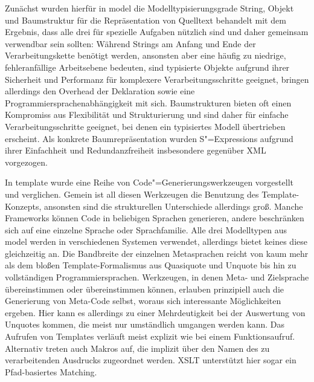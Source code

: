 \documentclass[12pt, a4paper, bibgerm]{scrbook}
\newcommand\cref{}
\newcommand{\sexps}{S"=Expressions}
\newcommand{\cgen}{Code"=Generierung}
\begin{document}
Zunächst wurden hierfür in \cref{model} die Modelltypisierungsgrade
String, Objekt und Baumstruktur für die Repräsentation von Quelltext
behandelt mit dem Ergebnis, dass alle drei für spezielle Aufgaben
nützlich sind und daher gemeinsam verwendbar sein sollten: Während
Strings am Anfang und Ende der Verarbeitungskette benötigt werden,
ansonsten aber eine häufig zu niedrige, fehleranfällige Arbeitsebene
bedeuten, sind typisierte Objekte aufgrund ihrer Sicherheit und
Performanz für komplexere Verarbeitungsschritte geeignet, bringen
allerdings den Overhead der Deklaration sowie eine
Programmiersprachenabhängigkeit mit sich. Baumstrukturen bieten oft
einen Kompromiss aus Flexibilität und Strukturierung und sind daher für
einfache Verarbeitungsschritte geeignet, bei denen ein typisiertes
Modell übertrieben erscheint. Als konkrete Baumrepräsentation wurden
\sexps{} aufgrund ihrer Einfachheit und Redundanzfreiheit insbesondere
gegenüber XML vorgezogen.

In \cref{template} wurde eine Reihe von \cgen{}swerkzeugen vorgestellt
und verglichen. Gemein ist all diesen Werkzeugen die Benutzung des
Template-Konzepts, ansonsten sind die strukturellen Unterschiede
allerdings groß. Manche Frameworks können Code in beliebigen Sprachen
generieren, andere beschränken sich auf eine einzelne Sprache oder
Sprachfamilie. Alle drei Modelltypen aus \cref{model} werden in
verschiedenen Systemen verwendet, allerdings bietet keines diese
gleichzeitig an. Die Bandbreite der einzelnen Metasprachen reicht von
kaum mehr als dem bloßen Template-Formalismus aus Quasiquote und Unquote
bis hin zu vollständigen Programmiersprachen. Werkzeugen, in denen Meta- und
Zielsprache übereinstimmen oder übereinstimmen können, erlauben
prinzipiell auch die Generierung von Meta-Code selbst, woraus sich
interessante Möglichkeiten ergeben. Hier kann es allerdings zu einer
Mehrdeutigkeit bei der Auswertung von Unquotes kommen, die meist nur
umständlich umgangen werden kann. Das Aufrufen von Templates verläuft
meist explizit wie bei einem Funktionsaufruf. Alternativ treten auch
Makros auf, die implizit über den Namen des zu verarbeitenden Ausdrucks
zugeordnet werden. XSLT unterstützt hier sogar ein Pfad-basiertes
Matching.
\end{document}

